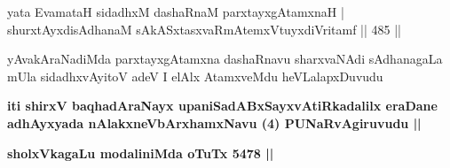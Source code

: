 \begin{shl}
yata EvamataH sidadhxM dashaRnaM parxtayxgAtamxnaH |
shurxtAyxdisAdhanaM sAkASxtasxvaRmAtemxVtuyxdiVritamf \hfill || 485 ||
\end{shl}

\begin{artha}
yAvakAraNadiMda parxtayxgAtamxna dashaRnavu sharxvaNAdi sAdhanagaLa mUla
sidadhxvAyitoV adeV I elAlx AtamxveMdu heVLalapxDuvudu 
\end{artha}

\begin{center}
\textbf{iti shirxV baqhadAraNayx upaniSadABxSayxvAtiRkadalilx eraDane
adhAyxyada nAlakxneVbArxhamxNavu (4) PUNaRvAgiruvudu ||}

\textbf{sholxVkagaLu modaliniMda oTuTx 5478 ||}
\end{center}
